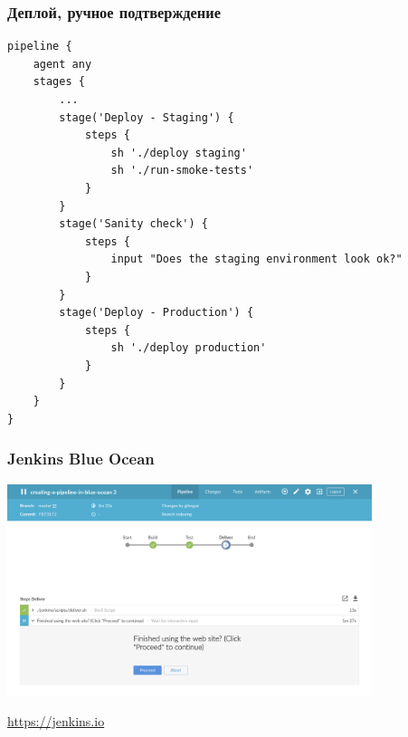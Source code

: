 \documentclass[xetex,mathserif,serif]{beamer}
\newcommand{\attribution}[1] {
	\begin{flushright}\begin{scriptsize}\textcolor{gray}{\textcopyright\; #1}\end{scriptsize}\end{flushright}
}
\begin{document}
	\begin{frame}[fragile]
		\frametitle{Деплой, ручное подтверждение}
		\begin{scriptsize}
			\begin{verbatim}
pipeline {
    agent any
    stages {
        ...
        stage('Deploy - Staging') {
            steps {
                sh './deploy staging'
                sh './run-smoke-tests'
            }
        }
        stage('Sanity check') {
            steps {
                input "Does the staging environment look ok?"
            }
        }
        stage('Deploy - Production') {
            steps {
                sh './deploy production'
            }
        }
    }
}
			\end{verbatim}
		\end{scriptsize}
	\end{frame}

	\begin{frame}
		\frametitle{Jenkins Blue Ocean}
		\begin{center}
			\includegraphics[width=0.8\textwidth]{blueOcean.png}
			\attribution{\url{https://jenkins.io}}
		\end{center}
	\end{frame}
\end{document}
